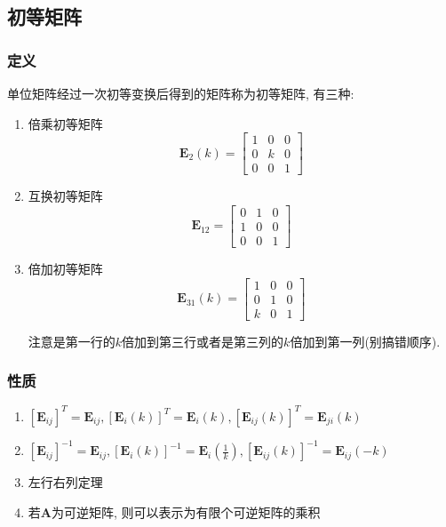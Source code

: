 \subsection{初等矩阵}
\subsubsection{定义}
单位矩阵经过一次初等变换后得到的矩阵称为初等矩阵, 有三种:
\begin{enumerate}
\item 倍乘初等矩阵
\begin{equation*}
\bm{E}_{2}(k)=
\begin{bmatrix}
1 & 0 & 0 \\
0 & k & 0 \\
0 & 0 & 1
\end{bmatrix}
\end{equation*}
\item 互换初等矩阵
\begin{equation*}
\bm{E}_{12}=
\begin{bmatrix}
0 & 1 & 0 \\
1 & 0 & 0 \\
0 & 0 & 1
\end{bmatrix}
\end{equation*}
\item 倍加初等矩阵
\begin{equation*}
\bm{E}_{31}(k)=
\begin{bmatrix}
1 & 0 & 0 \\
0 & 1 & 0 \\
k & 0 & 1
\end{bmatrix}
\end{equation*}\par 注意是第一行的$ k $倍加到第三行或者是第三列的$ k $倍加到第一列(别搞错顺序).
\end{enumerate}
\subsubsection{性质}
\begin{enumerate}
\item $ [\bm{E}_{ij}]^{T}=\bm{E}_{ij}, [\bm{E}_{i}(k)]^{T}=\bm{E}_{i}(k), [\bm{E}_{ij}(k)]^{T}=\bm{E}_{ji}(k) $
\item $ [\bm{E}_{ij}]^{-1}=\bm{E}_{ij}, [\bm{E}_{i}(k)]^{-1}=\bm{E}_{i}(\frac{1}{k}), [\bm{E}_{ij}(k)]^{-1}=\bm{E}_{ij}(-k) $
\item 左行右列定理
\item 若$ \bm{A} $为可逆矩阵, 则可以表示为有限个可逆矩阵的乘积
\end{enumerate}
